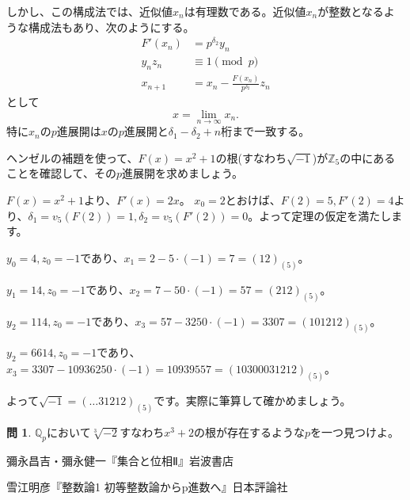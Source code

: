\documentclass[uplatex]{jsarticle}
\newcommand{\Z}{\mathbb{Z}}
\newcommand{\Q}{\mathbb{Q}}
\theoremstyle{definition} %
\newtheorem*{exercise*}{問}
\begin{document}
しかし、この構成法では、近似値$x_n$は有理数である。近似値$x_n$が整数となるような構成法もあり、次のようにする。
\begin{align*}
F'(x_n) &= p^{\delta_2} y_n\\
y_n z_n &\equiv 1 \pmod p\\
x_{n+1} &= x_n - \frac{F(x_n)}{p^{\delta_2}} z_n
\end{align*}
として
\[x = \lim_{n\to\infty}x_n.\]
特に$x_n$の$p$進展開は$x$の$p$進展開と$\delta_1 - \delta_2 + n$桁まで一致する。

ヘンゼルの補題を使って、$F(x) = x^2+1$の根(すなわち$\sqrt{-1}$)が$\Z_5$の中にあることを確認して、その$p$進展開を求めましょう。

$F(x) = x^2+1$より、$F'(x) = 2x$。
$x_0 = 2$とおけば、$F(2) = 5, F'(2) = 4$より、$\delta_1 = v_5(F(2)) = 1, \delta_2 = v_5(F'(2)) = 0$。よって定理の仮定を満たします。

$y_0 = 4, z_0 = -1$であり、$x_1 = 2 - 5 \cdot (-1) = 7 = (12)_{(5)}$。

$y_1 = 14, z_0 = -1$であり、$x_2 = 7 - 50 \cdot (-1) = 57 = (212)_{(5)}$。

$y_2 = 114, z_0 = -1$であり、$x_3 = 57 - 3250 \cdot (-1) = 3307 = (101212)_{(5)}$。

$y_2 = 6614, z_0 = -1$であり、$x_3 = 3307 - 10936250 \cdot (-1) = 10939557 = (10300031212)_{(5)}$。

よって$\sqrt{-1} = (\dots31212)_{(5)}$です。実際に筆算して確かめましょう。

\begin{exercise*}
$\Q_p$において$\sqrt[3]{-2}$すなわち$x^3+2$の根が存在するような$p$を一つ見つけよ。
\end{exercise*}



\begin{thebibliography}{9}
\item 彌永昌吉・彌永健一『集合と位相Ⅱ』岩波書店
\item 雪江明彦『整数論1 初等整数論からp進数へ』日本評論社
\end{thebibliography}
\end{document}

